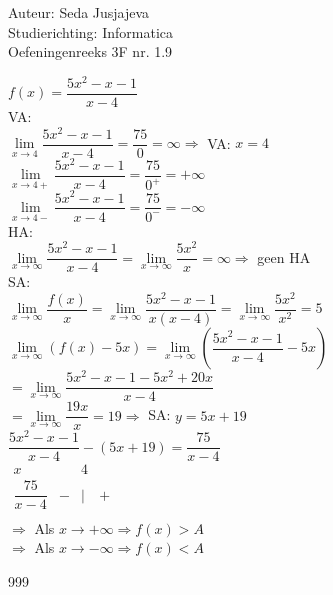 \documentclass[a4paper]{article}
\newcommand{\limit}{\lim\limits}
\begin{document}
\noindent \large Auteur: Seda Jusjajeva\\
\noindent \large Studierichting: Informatica\\
\noindent \large Oefeningenreeks 3F nr. 1.9 \\

\medskip

\normalsize


$f(x) = \dfrac{5x^2 - x - 1}{x - 4}$ \\

VA: \\

$\limit_{x\to4}\dfrac{5x^2 - x - 1}{x - 4} = \dfrac{75}{0} =\infty\Rightarrow$ VA: $x = 4$ \\

$\limit_{x\to4+}\dfrac{5x^2 - x - 1}{x - 4} = \dfrac{75}{0^+} = +\infty$ \\

$\limit_{x\to4-}\dfrac{5x^2 - x - 1}{x - 4} = \dfrac{75}{0^-} = -\infty$ \\

HA: \\

$\limit_{x\to\infty}\dfrac{5x^2 - x - 1}{x - 4} = \limit_{x\to\infty}\dfrac{5x^2}{x} = \infty\Rightarrow$ geen HA \\

SA: \\

$\limit_{x\to\infty}\dfrac{f(x)}{x} = \limit_{x\to\infty}\dfrac{5x^2 - x - 1}{x(x - 4)} = \limit_{x\to\infty}\dfrac{5x^2}{x^2} = 5$ \\

$\limit_{x\to\infty}\left(f(x) - 5x\right) = \limit_{x\to\infty}\left(\dfrac{5x^2 - x - 1}{x - 4} - 5x\right)$ \\

$= \limit_{x\to\infty}\dfrac{5x^2 - x - 1 - 5x^2 + 20x}{x - 4}$ \\

$= \limit_{x\to\infty}\dfrac{19x}{x} = 19\Rightarrow$ SA: $y = 5x + 19$\\

$\dfrac{5x^2 - x - 1}{x - 4} - (5x + 19) = \dfrac{75}{x - 4}$ \\

$\begin{array}{r|ccc}
    x                 &   & 4     &   \\
    \hline  
    \dfrac{75}{x - 4} & - & \vert & + \\
\end{array}$ \\

$\Rightarrow$ Als $x\rightarrow+\infty\Rightarrow f(x) > A$ \\

$\Rightarrow$ Als $x\rightarrow-\infty\Rightarrow f(x) < A$ \\



\begin{thebibliography}{999}
\end{thebibliography}
\end{document}
